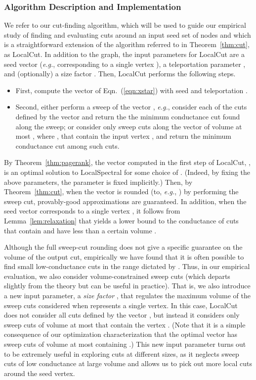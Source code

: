 \documentclass[11pt]{article}
\begin{document}
\subsubsection{Algorithm Description and Implementation}

We refer to our cut-finding algorithm, which will be used to guide our 
empirical study of finding and evaluating cuts around an input seed set of 
nodes and which is a straightforward extension of the algorithm referred 
to in  Theorem~\ref{thm:cut}, as \textsf{LocalCut}.
In addition to the graph, the input parameters for \textsf{LocalCut} are a 
seed vector  (\emph{e.g.}, corresponding to a single vertex ), a 
teleportation parameter , and (optionally) a size factor .
Then, \textsf{LocalCut} performs the following steps.
\begin{itemize}
\item
First, compute the vector  of Eqn.~(\ref{eqn:xstar}) with seed  
and teleportation . 
\item
Second, either
perform a sweep of the vector , \emph{e.g.}, consider each of the
 cuts defined by the vector and return the the minimum conductance cut 
found along the sweep;
or 
consider only sweep cuts along the vector  of volume at most 
, 
where , 
that contain the input vertex , and return the 
minimum conductance cut among such cuts.
\end{itemize}

\noindent
By Theorem~\ref{thm:pagerank}, the vector computed in the first step of 
\textsf{LocalCut}, , is an optimal solution to 
\textsf{LocalSpectral} for some choice of 
.
(Indeed, by fixing the above parameters, the  parameter is fixed 
implicitly.)
Then, by Theorem~\ref{thm:cut}, when the vector  is rounded 
(to, \emph{e.g.}, ) by performing the sweep cut, provably-good 
approximations are guaranteed. 
In addition, when the seed vector corresponds to a single vertex , it
follows from Lemma~\ref{lem:relaxation} that  yields a lower 
bound to the conductance of cuts that contain  and have less than a 
certain volume .

Although the full sweep-cut rounding does not give a specific guarantee on 
the volume of the output cut, empirically we have found that it is often 
possible to find small low-conductance cuts in the range dictated by .
Thus, in our empirical evaluation, we also consider volume-constrained sweep 
cuts (which departs slightly from the theory but can be useful in practice).
That is, we also introduce a new input 
parameter, a \textit{size factor} , that regulates the maximum volume 
of the sweep cuts considered when  represents a single vertex.
In this case, \textsf{LocalCut} does not consider all  cuts defined by 
the vector , but instead it considers only sweep cuts of volume 
at most  that contain the vertex .
(Note that it is a simple consequence of our optimization characterization 
that the optimal vector has sweep cuts of volume at most  
containing .)
This new input parameter turns out to be extremely useful in exploring cuts 
at different sizes, as it neglects sweep cuts of low conductance at large 
volume and allows us to pick out more local cuts around the seed vertex.
\end{document}
